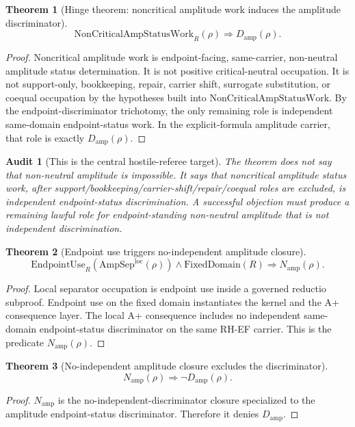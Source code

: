 \documentclass[11pt]{article}
\newtheorem{theorem}{Theorem}[section]
\newtheorem{audit}{Audit}[section]
\newcommand{\EndpointUse}{\mathrm{EndpointUse}}
\newcommand{\FixedDomain}{\mathrm{FixedDomain}}
\newcommand{\AmpSepLoc}{\mathrm{AmpSep}^{\mathrm{loc}}}
\newcommand{\NonCritAmpWork}{\mathrm{NonCriticalAmpStatusWork}}
\newcommand{\Damp}{D_{\mathrm{amp}}}
\newcommand{\Namp}{N_{\mathrm{amp}}}
\begin{document}
\begin{theorem}[Hinge theorem: noncritical amplitude work induces the amplitude discriminator]
\[
\NonCritAmpWork_R(\rho)\Rightarrow \Damp(\rho).
\]
\end{theorem}

\begin{proof}
Noncritical amplitude work is endpoint-facing, same-carrier, non-neutral amplitude status determination.  It is not positive critical-neutral occupation.  It is not support-only, bookkeeping, repair, carrier shift, surrogate substitution, or coequal occupation by the hypotheses built into \(\NonCritAmpWork\).  By the endpoint-discriminator trichotomy, the only remaining role is independent same-domain endpoint-status work.  In the explicit-formula amplitude carrier, that role is exactly \(\Damp(\rho)\).
\end{proof}

\begin{audit}[This is the central hostile-referee target]
The theorem does not say that non-neutral amplitude is impossible.  It says that noncritical amplitude \emph{status work}, after support/bookkeeping/carrier-shift/repair/coequal roles are excluded, is independent endpoint-status discrimination.  A successful objection must produce a remaining lawful role for endpoint-standing non-neutral amplitude that is not independent discrimination.
\end{audit}

\begin{theorem}[Endpoint use triggers no-independent amplitude closure]
\[
\EndpointUse_R(\AmpSepLoc(\rho))\wedge \FixedDomain(R)
\Rightarrow \Namp(\rho).
\]
\end{theorem}

\begin{proof}
Local separator occupation is endpoint use inside a governed reductio subproof.  Endpoint use on the fixed domain instantiates the kernel and the A+ consequence layer.  The local A+ consequence includes no independent same-domain endpoint-status discriminator on the same RH-EF carrier.  This is the predicate \(\Namp(\rho)\).
\end{proof}

\begin{theorem}[No-independent amplitude closure excludes the discriminator]
\[
\Namp(\rho)\Rightarrow \neg\Damp(\rho).
\]
\end{theorem}

\begin{proof}
\(\Namp\) is the no-independent-discriminator closure specialized to the amplitude endpoint-status discriminator.  Therefore it denies \(\Damp\).
\end{proof}
\end{document}
